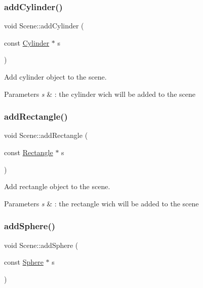 \subsubsection{\texorpdfstring{add\+Cylinder()}{addCylinder()}}
{\footnotesize\ttfamily void Scene\+::add\+Cylinder (\begin{DoxyParamCaption}\item[{const \hyperlink{classCylinder}{Cylinder} $\ast$}]{s }\end{DoxyParamCaption})\hspace{0.3cm}{\ttfamily [inline]}}



Add cylinder object to the scene. 


\begin{DoxyParams}{Parameters}
{\em s} & \+: the cylinder wich will be added to the scene \\
\hline
\end{DoxyParams}
\mbox{\label{classScene_a926114a1fed32caabbc716c213e70637}} 
\subsubsection{\texorpdfstring{add\+Rectangle()}{addRectangle()}}
{\footnotesize\ttfamily void Scene\+::add\+Rectangle (\begin{DoxyParamCaption}\item[{const \hyperlink{classRectangle}{Rectangle} $\ast$}]{s }\end{DoxyParamCaption})\hspace{0.3cm}{\ttfamily [inline]}}



Add rectangle object to the scene. 


\begin{DoxyParams}{Parameters}
{\em s} & \+: the rectangle wich will be added to the scene \\
\hline
\end{DoxyParams}
\mbox{\label{classScene_aa1cc40909ebbe9ed5933566d9a3663d2}} 
\subsubsection{\texorpdfstring{add\+Sphere()}{addSphere()}}
{\footnotesize\ttfamily void Scene\+::add\+Sphere (\begin{DoxyParamCaption}\item[{const \hyperlink{classSphere}{Sphere} $\ast$}]{s }\end{DoxyParamCaption})\hspace{0.3cm}{\ttfamily [inline]}}



